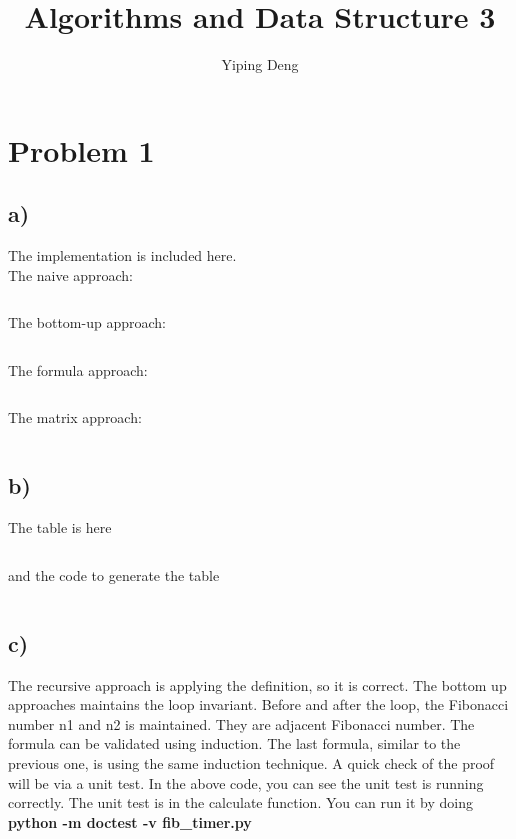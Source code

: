 \documentclass{article}
\newcommand{\hwnumber}{3}
\begin{document}
\title{Algorithms and Data Structure \hwnumber}
\author{Yiping Deng}
\maketitle
\thispagestyle{fancy}
\section*{Problem 1}
\subsection*{a)}
The implementation is included here. \\
The naive approach:
\inputminted{Python}{code/recursive_fib.py}
The bottom-up approach:
\inputminted{Python}{code/bottom_up_fib.py}
The formula approach:
\inputminted{Python}{code/formula_fib.py}
The matrix approach:
\inputminted{Python}{code/matrix_fib.py}
\subsection*{b)}
The table is here
\inputminted{Text}{code/result.txt}
and the code to generate the table
\inputminted{Python}{code/fib_timer.py}
\subsection*{c)}
The recursive approach is applying the definition, so it is correct.
The bottom up approaches maintains the loop invariant. 
Before and after the loop, the Fibonacci number n1 and n2 is maintained.
They are adjacent Fibonacci number.
The formula can be validated using induction.
The last formula, similar to the previous one, is using the same induction technique.
A quick check of the proof will be via a unit test. 
In the above code, you can see the unit test is running correctly.
The unit test is in the calculate function. You can run it by
doing \textbf{python -m doctest -v fib\_timer.py}
\end{document}
